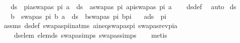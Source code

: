 \begin{isabellebody}
\ \ \ {\isachardoublequoteopen}{\isacharparenleft}{\kern0pt}ds\ {\isacharbrackleft}{\kern0pt}{\isacharbrackright}{\kern0pt}\ pi{\isacharparenright}{\kern0pt}{\isacharminus}{\kern0pt}{\isacharbraceleft}{\kern0pt}a{\isacharcomma}{\kern0pt}swapas\ pi\ a{\isacharbraceright}{\kern0pt}\ {\isacharequal}{\kern0pt}\ {\isacharparenleft}{\kern0pt}ds\ {\isacharbrackleft}{\kern0pt}{\isacharbrackright}{\kern0pt}\ {\isacharparenleft}{\kern0pt}{\isacharparenleft}{\kern0pt}a{\isacharcomma}{\kern0pt}swapas\ pi\ a{\isacharparenright}{\kern0pt}{\isacharhash}{\kern0pt}pi{\isacharparenright}{\kern0pt}{\isacharparenright}{\kern0pt}{\isacharminus}{\kern0pt}{\isacharbraceleft}{\kern0pt}swapas\ pi\ a{\isacharbraceright}{\kern0pt}{\isachardoublequoteclose}\isanewline
%
\isadelimproof
\ \ %
\endisadelimproof
%
\isatagproof
{}\isamarkupfalse%
\ ds{\isacharunderscore}{\kern0pt}def\ \isamarkupfalse%
\ auto%
\endisatagproof
{\isafoldproof}%
%
\isadelimproof
\isanewline
%
\endisadelimproof
\isanewline
{}\isamarkupfalse%
\ ds{\isacharunderscore}{\kern0pt}{}{\isacharcolon}{\kern0pt}\ \isanewline
\ \ \ {\isachardoublequoteopen}b\ {\isasymnoteq}\ swapas\ pi\ b{\isachardoublequoteclose}\ {\isachardoublequoteopen}a\ {\isasymin}\ ds\ {\isacharbrackleft}{\kern0pt}{\isacharbrackright}{\kern0pt}\ {\isacharparenleft}{\kern0pt}{\isacharparenleft}{\kern0pt}b{\isacharcomma}{\kern0pt}swapas\ pi\ b{\isacharparenright}{\kern0pt}{\isacharhash}{\kern0pt}pi{\isacharparenright}{\kern0pt}{\isachardoublequoteclose}\isanewline
\ \ \ {\isachardoublequoteopen}a{\isasymin}ds\ {\isacharbrackleft}{\kern0pt}{\isacharbrackright}{\kern0pt}\ pi{\isachardoublequoteclose}\isanewline
%
\isadelimproof
\ \ %
\endisadelimproof
%
\isatagproof
{}\isamarkupfalse%
\ assms\ ds{\isacharunderscore}{\kern0pt}def\ swapas{\isacharunderscore}{\kern0pt}pi{\isacharunderscore}{\kern0pt}in{\isacharunderscore}{\kern0pt}atms\ a{\isacharunderscore}{\kern0pt}ineq{\isacharunderscore}{\kern0pt}swapas{\isacharunderscore}{\kern0pt}pi\ swapas{\isacharunderscore}{\kern0pt}rev{\isacharunderscore}{\kern0pt}pi{\isacharunderscore}{\kern0pt}a\ \isanewline
\ \ \ \ ds{\isacharunderscore}{\kern0pt}elem\ elem{\isacharunderscore}{\kern0pt}ds\ swapa{\isachardot}{\kern0pt}simps\ swapas{\isachardot}{\kern0pt}simps{\isacharparenleft}{\kern0pt}{}{\isacharparenright}{\kern0pt}\isanewline
\ \ \isamarkupfalse%
\ metis%
\endisatagproof
{\isafoldproof}%
%
\isadelimproof
\isanewline
%
\endisadelimproof

\end{isabellebody}
